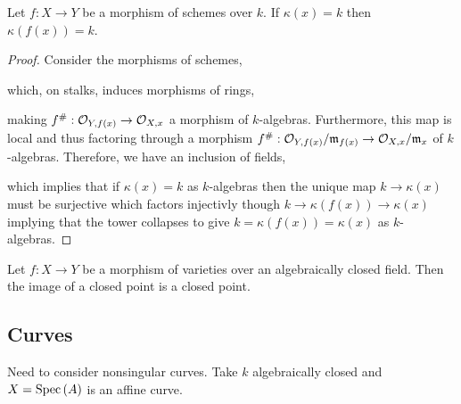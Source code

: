 \documentclass[12pt]{article}
\begin{document}
\begin{proposition}
Let $f : X \to Y$ be a morphism of schemes over $k$. If $\kappa(x) = k$ then $\kappa(f(x)) = k$.
\end{proposition}

\begin{proof}
Consider the morphisms of schemes,
\begin{center}
\end{center}
which, on stalks, induces morphisms of rings, 
\begin{center}
\end{center}
making $f^\# : \mathcal{O}_{Y, f(x)} \to \mathcal{O}_{X, x}$ a morphism of $k$-algebras. Furthermore, this map is local and thus factoring through a morphism $f^\# : \mathcal{O}_{Y, f(x)} / \mathfrak{m}_{f(x)} \to \mathcal{O}_{X, x} / \mathfrak{m}_x$ of $k$-algebras. Therefore, we have an inclusion of fields,
\begin{center}
\end{center} 
which implies that if $\kappa(x) = k$ as $k$-algebras then the unique map $k \to \kappa(x)$ must be surjective which factors injectivly though $k \to \kappa(f(x)) \to \kappa(x)$ implying that the tower collapses to give $k = \kappa(f(x)) = \kappa(x)$ as $k$-algebras. 
\end{proof}

\begin{corollary}
Let $f : X \to Y$ be a morphism of varieties over an algebraically closed field. Then the image of a closed point is a closed point. 
\end{corollary}


\subsection{Curves} 

Need to consider nonsingular curves. Take $k$ algebraically closed and $X = \mathrm{Spec}\left( A \right)$ is an affine curve.
\end{document}

